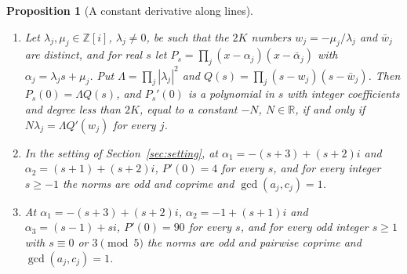 \documentclass[11pt]{article}
\newtheorem{proposition}[theorem]{Proposition}
\begin{document}
\begin{proposition}[A constant derivative along lines]\label{prop:gaussline}
\begin{enumerate}
\item Let $\lambda_j,\mu_j\in\mathbb Z[i]$, $\lambda_j\ne0$, be such that the
$2K$ numbers $w_j=-\mu_j/\lambda_j$ and $\bar w_j$ are distinct, and for real
$s$ let $P_s=\prod_j(x-\alpha_j)(x-\bar\alpha_j)$ with
$\alpha_j=\lambda_js+\mu_j$.  Put $\Lambda=\prod_j|\lambda_j|^2$ and
$Q(s)=\prod_j(s-w_j)(s-\bar w_j)$.  Then $P_s(0)=\Lambda Q(s)$, and $P_s'(0)$
is a polynomial in $s$ with integer coefficients and degree less than $2K$,
equal to a constant $-N$, $N\in\mathbb R$, if and only if $N\lambda_j=\Lambda Q'(w_j)$ for
every $j$.
\item In the setting of Section~\ref{sec:setting}, at $\alpha_1=-(s+3)+(s+2)i$
and $\alpha_2=(s+1)+(s+2)i$,
$P'(0)=4$ for every $s$, and for every integer $s\ge-1$ the norms are odd and
coprime and $\gcd(a_j,c_j)=1$.
\item At $\alpha_1=-(s+3)+(s+2)i$, $\alpha_2=-1+(s+1)i$ and
$\alpha_3=(s-1)+si$, $P'(0)=90$ for every $s$, and for every odd integer
$s\ge1$ with $s\equiv0$ or $3\pmod5$ the norms are odd and pairwise coprime and
$\gcd(a_j,c_j)=1$.
\end{enumerate}
\end{proposition}
\end{document}
